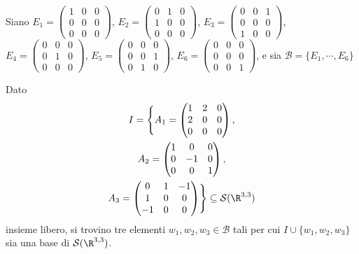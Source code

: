 {Siano $E_1=\begin{pmatrix}
1 & 0 & 0\\
0 & 0 & 0\\
0 & 0 & 0
\end{pmatrix}$, $E_2=\begin{pmatrix}
0 & 1 & 0\\
1 & 0 & 0\\
0 & 0 & 0
\end{pmatrix}$, $E_3=\begin{pmatrix}
0 & 0 & 1\\
0 & 0 & 0\\
1 & 0 & 0
\end{pmatrix}$, $E_4=\begin{pmatrix}
0 & 0 & 0\\
0 & 1 & 0\\
0 & 0 & 0
\end{pmatrix}$, $E_5=\begin{pmatrix}
0 & 0 & 0\\
0 & 0 & 1\\
0 & 1 & 0
\end{pmatrix}$, $E_6=\begin{pmatrix}
0 & 0 & 0\\
0 & 0 & 0\\
0 & 0 & 1
\end{pmatrix}$, e sia $\mathscr{B}=\{E_1, \cdots, E_6\}$

Dato
\begin{multline*}
I=\Biggl\{A_1=\begin{pmatrix}
1 & 2 & 0\\
2 & 0 & 0\\
0 & 0 & 0
\end{pmatrix},\\ A_2=\begin{pmatrix}
1 & 0 & 0\\
0 & -1 & 0\\
0 & 0 & 1
\end{pmatrix},\\ A_3=\begin{pmatrix}
0 & 1 & -1\\
1 & 0 & 0\\
-1 & 0 & 0
\end{pmatrix}\Biggr\}\subseteq\mathcal{S}(\R^{3,3})
\end{multline*}
insieme libero, si trovino tre elementi $w_1, w_2, w_3\in\mathscr{B}$ tali per cui $I\cup\{w_1, w_2, w_3\}$ sia una base di $\mathcal{S}(\R^{3,3})$.

}
